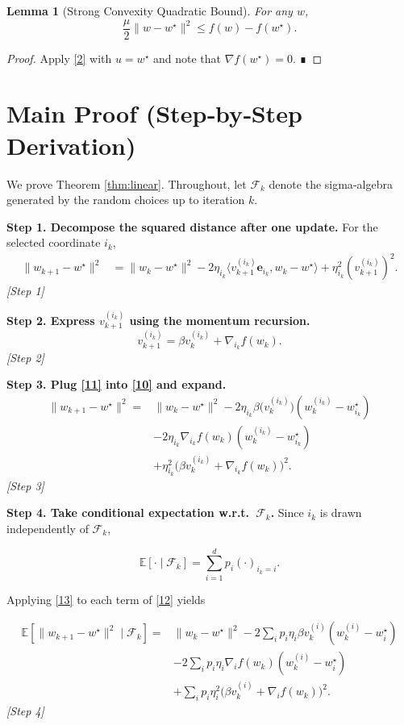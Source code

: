 \documentclass{article}
\newtheorem{lemma}{Lemma}
\newcommand{\E}{\mathbb{E}}
\begin{document}
\begin{lemma}[Strong Convexity Quadratic Bound]\label{lem:sc}
For any $w$,
\[
\frac{\mu}{2}\|w-w^{\star}\|^{2}\le f(w)-f(w^{\star}) .
\tag{9}
\]
\end{lemma}
\begin{proof}
Apply \eqref{2} with $u=w^{\star}$ and note that $\nabla f(w^{\star})=0$. ∎
\end{proof}

\section*{Main Proof (Step‑by‑Step Derivation)}
We prove Theorem \ref{thm:linear}. Throughout, let $\mathcal F_k$ denote the sigma‑algebra generated by the random choices up to iteration $k$.

\noindent\textbf{Step 1. Decompose the squared distance after one update.}  
For the selected coordinate $i_k$,
\[
\begin{aligned}
\|w_{k+1}-w^{\star}\|^{2}
&= \|w_{k}-w^{\star}\|^{2}
   -2\eta_{i_k}\langle v_{k+1}^{(i_k)}\bm e_{i_k}, w_{k}-w^{\star}\rangle
   +\eta_{i_k}^{2}(v_{k+1}^{(i_k)})^{2}.
\end{aligned}
\tag{10}
\]
\emph{[Step 1]}

\noindent\textbf{Step 2. Express $v_{k+1}^{(i_k)}$ using the momentum recursion.}
\[
v_{k+1}^{(i_k)} = \beta v_{k}^{(i_k)} + \nabla_{i_k}f(w_{k}).
\tag{11}
\]
\emph{[Step 2]}

\noindent\textbf{Step 3. Plug \eqref{11} into \eqref{10} and expand.}
\[
\begin{aligned}
\|w_{k+1}-w^{\star}\|^{2}
=&\|w_{k}-w^{\star}\|^{2}
   -2\eta_{i_k}\beta\bigl(v_{k}^{(i_k)}\bigr)(w_{k}^{(i_k)}-w^{\star}_{i_k}) \\
 &-2\eta_{i_k}\nabla_{i_k}f(w_{k})(w_{k}^{(i_k)}-w^{\star}_{i_k}) \\
 &+\eta_{i_k}^{2}\bigl(\beta v_{k}^{(i_k)}+\nabla_{i_k}f(w_{k})\bigr)^{2}.
\end{aligned}
\tag{12}
\]
\emph{[Step 3]}

\noindent\textbf{Step 4. Take conditional expectation w.r.t.\ $\mathcal F_k$.}
Since $i_k$ is drawn independently of $\mathcal F_k$,  

\[
\E[\cdot\mid\mathcal F_k]=\sum_{i=1}^{d}p_i(\cdot)_{i_k=i}.
\tag{13}
\]

Applying \eqref{13} to each term of \eqref{12} yields  

\[
\begin{aligned}
\E[\|w_{k+1}-w^{\star}\|^{2}\mid\mathcal F_k]
=&\|w_{k}-w^{\star}\|^{2}
   -2\sum_{i}p_i\eta_i\beta v_{k}^{(i)}(w_{k}^{(i)}-w^{\star}_{i})\\
 &-2\sum_{i}p_i\eta_i\nabla_i f(w_{k})(w_{k}^{(i)}-w^{\star}_{i})\\
 &+\sum_{i}p_i\eta_i^{2}\bigl(\beta v_{k}^{(i)}+\nabla_i f(w_{k})\bigr)^{2}.
\end{aligned}
\tag{14}
\]
\emph{[Step 4]}
\end{document}

